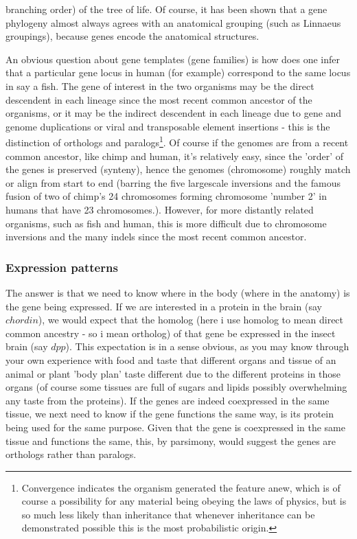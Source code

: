 branching order) of the tree of life.  Of course, it has been shown that a gene phylogeny almost always agrees with an anatomical grouping (such as Linnaeus groupings), because genes encode the anatomical structures\cite{One must still be careful using just anatomical features for determining the topology of the tree, as mimics commonly seen in insect world in predator prey systems clearly demonstrate that anatomical features can be evolved independently.  However, internal anatomy structures like the coelom or the central nervous system are much stronger anatomical features for determining evolution, since these features are very complex and much harder to evolve de novo.}.

An obvious question about gene templates (gene families) is how does one infer that a particular gene locus in human (for example) correspond to the same locus in say a fish.  The gene of interest in the two organisms may be the direct descendent in each lineage since the most recent common ancestor of the organisms, or it may be the indirect descendent in each lineage due to gene and genome duplications or viral and transposable element insertions - this is the distinction of orthologs and paralogs\footnote{Convergence indicates the organism generated the feature anew, which is of course a possibility for any material being obeying the laws of physics, but is so much less likely than inheritance that whenever inheritance can be demonstrated possible this is the most probabilistic origin.}.  Of course if the genomes are from a recent common ancestor, like chimp and human, it's relatively easy, since the 'order' of the genes is preserved (synteny), hence the genomes (chromosome) roughly match or align from start to end (barring the five largescale inversions and the famous fusion of two of chimp's 24 chromosomes forming chromosome 'number 2' in humans that have 23 chromosomes.).  However, for more distantly related organisms, such as fish and human, this is more difficult due to chromosome inversions and the many indels since the most recent common ancestor.  
\subsubsection*{Expression patterns}
The answer is that we need to know where in the body (where in the anatomy) is the gene being expressed.  If we are interested in a protein in the brain (say $chordin$), we would expect that the homolog (here i use homolog to mean direct common ancestry - so i mean ortholog) of that gene be expressed in the insect brain (say $dpp$).  This expectation is in a sense obvious, as you may know through your own experience with food and taste that different organs and tissue of an animal or plant 'body plan' taste different due to the different proteins in those organs (of course some tissues are full of sugars and lipids possibly overwhelming any taste from the proteins).  If the genes are indeed coexpressed in the same tissue, we next need to know if the gene functions the same way, is its protein being used for the same purpose.  Given that the gene is coexpressed in the same tissue and functions the same, this, by parsimony, would suggest the genes are orthologs rather than paralogs.

